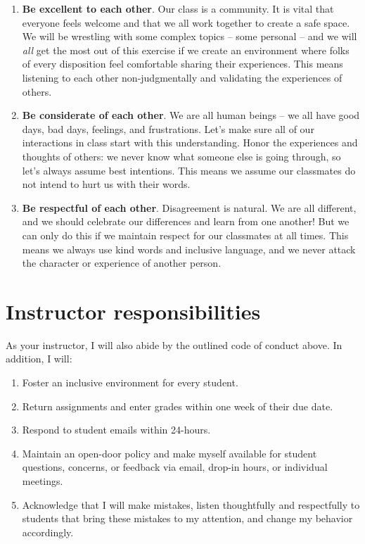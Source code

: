 \documentclass[
]{report}
\providecommand{\tightlist}{%
  \setlength{\itemsep}{0pt}\setlength{\parskip}{0pt}}
\providecommand{\tightlist}{%
  \setlength{\itemsep}{0pt}\setlength{\parskip}{0pt}}
\begin{document}
\begin{enumerate}
\def\labelenumi{\arabic{enumi}.}
\tightlist
\item
  \textbf{Be excellent to each other}. Our class is a community. It is vital that everyone feels welcome and that we all work together to create a safe space. We will be wrestling with some complex topics -- some personal -- and we will \emph{all} get the most out of this exercise if we create an environment where folks of every disposition feel comfortable sharing their experiences. This means listening to each other non-judgmentally and validating the experiences of others.
\item
  \textbf{Be considerate of each other}. We are all human beings -- we all have good days, bad days, feelings, and frustrations. Let's make sure all of our interactions in class start with this understanding. Honor the experiences and thoughts of others: we never know what someone else is going through, so let's always assume best intentions. This means we assume our classmates do not intend to hurt us with their words.
\item
  \textbf{Be respectful of each other}. Disagreement is natural. We are all different, and we should celebrate our differences and learn from one another! But we can only do this if we maintain respect for our classmates at all times. This means we always use kind words and inclusive language, and we never attack the character or experience of another person.
\end{enumerate}

\hypertarget{instructor-responsibilities}{%
\section*{Instructor responsibilities}\label{instructor-responsibilities}}

As your instructor, I will also abide by the outlined code of conduct above. In addition, I will:

\begin{enumerate}
\def\labelenumi{\arabic{enumi}.}
\tightlist
\item
  Foster an inclusive environment for every student.
\item
  Return assignments and enter grades within one week of their due date.
\item
  Respond to student emails within 24-hours.
\item
  Maintain an open-door policy and make myself available for student questions, concerns, or feedback via email, drop-in hours, or individual meetings.
\item
  Acknowledge that I will make mistakes, listen thoughtfully and respectfully to students that bring these mistakes to my attention, and change my behavior accordingly.
\end{enumerate}
\end{document}

